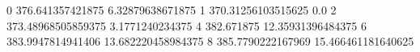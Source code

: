 0 376.641357421875 6.32879638671875
1 370.31256103515625 0.0
2 373.48968505859375 3.1771240234375
4 382.671875 12.35931396484375
6 383.9947814941406 13.682220458984375
8 385.7790222167969 15.466461181640625
